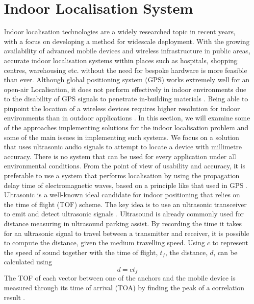 \documentclass[]{final_report}
\begin{document}
\chapter{\label{chapter2} Indoor Localisation System}

Indoor localisation technologies are a widely researched topic in recent years, with a focus on developing a method for widescale deployment. With the growing availability of advanced mobile devices and wireless infrastructure in public areas, accurate indoor localisation systems within places such as hospitals, shopping centres, warehousing etc. without the need for bespoke hardware is more feasible than ever. Although global positioning system (GPS) works extremely well for an open-air Localisation, it does not perform effectively in indoor environments due to the disability of GPS signals to penetrate in-building materials \cite{wu2013csi}.  Being able to pinpoint the location of a wireless devices requires higher resolution for indoor environments than in outdoor applications \cite{xiao2016survey}. In this section, we will examine some of the approaches implementing solutions for the indoor localisation problem and some of the main issues in implementing such systems. We focus on a solution that uses ultrasonic audio signals to attempt to locate a device with millimetre accuracy. There is no system that can be used for every application under all environmental conditions. From the point of view of usability and accuracy, it is preferable to use a system that performs localisation by using the propagation delay time of electromagnetic waves, based on a principle like that used in GPS \cite{minami2007design}.
Ultrasonic is a well-known ideal candidate for indoor positioning that relies on the time of flight (TOF) scheme. The key idea is to use an ultrasonic transceiver to emit and detect ultrasonic signals \cite{piontek2007improving}. Ultrasound is already commonly used for distance measuring in ultrasound parking assist. By recording the time it takes for an ultrasonic signal to travel between a transmitter and receiver, it is possible to compute the distance, given the medium travelling speed. Using $c$ to represent the speed of sound together with the time of flight, $t_{f}$, the distance, $d$, can be calculated using \[ d=ct_{f} \]
The TOF of each vector between one of the anchors and the mobile device is measured through its time of arrival (TOA) by finding the peak of a correlation result \cite{moutinho2016indoor}.
\end{document}
